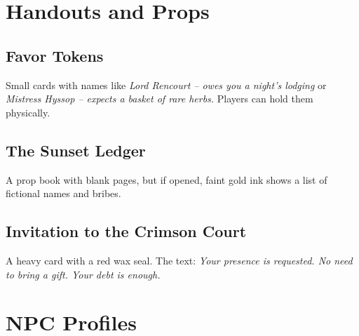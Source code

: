 \documentclass[12pt]{book}
\begin{document}
\chapter{Handouts and Props}

\section{Favor Tokens}

Small cards with names like \textit{Lord Rencourt -- owes you a night's lodging} or \textit{Mistress Hyssop -- expects a basket of rare herbs.} Players can hold them physically.

\section{The Sunset Ledger}

A prop book with blank pages, but if opened, faint gold ink shows a list of fictional names and bribes.

\section{Invitation to the Crimson Court}

A heavy card with a red wax seal. The text: \textit{Your presence is requested. No need to bring a gift. Your debt is enough.}

\chapter{NPC Profiles}
\end{document}
